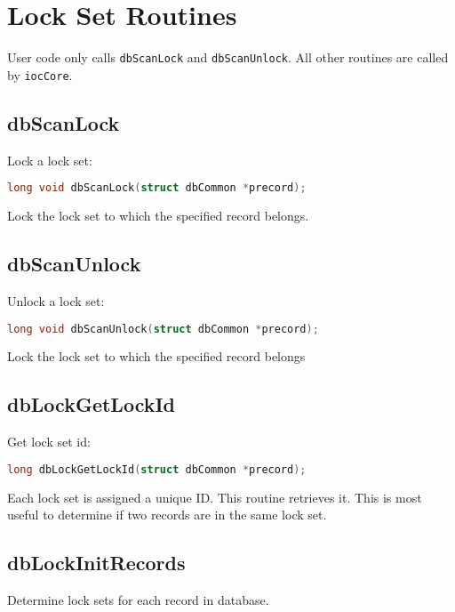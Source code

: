 \section{Lock Set Routines}

User code only calls \verb|dbScanLock| and \verb|dbScanUnlock|.
All other routines are called by \verb|iocCore|.

\subsection{dbScanLock}

Lock a lock set:

\begin{lstlisting}[language=C]
long void dbScanLock(struct dbCommon *precord);
\end{lstlisting}

Lock the lock set to which the specified record belongs.

\subsection{dbScanUnlock}

Unlock a lock set:

\begin{lstlisting}[language=C]
long void dbScanUnlock(struct dbCommon *precord);
\end{lstlisting}

Lock the lock set to which the specified record belongs

\subsection{dbLockGetLockId}

Get lock set id:

\begin{lstlisting}[language=C]
long dbLockGetLockId(struct dbCommon *precord);
\end{lstlisting}

Each lock set is assigned a unique ID.
This routine retrieves it.
This is most useful to determine if two records are in the same lock set.

\subsection{dbLockInitRecords}

Determine lock sets for each record in database.


